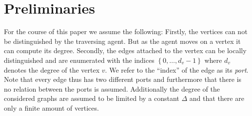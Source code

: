 \documentclass[draft,oneside]{scrartcl}
\begin{document}
\section{Preliminaries}
For the course of this paper we assume the following: Firstly, the vertices can
not be distinguished by the traversing agent. But as the agent moves on a
vertex it can compute its degree. Secondly, the edges attached to the vertex
can be locally distinguished and are enumerated with the indices
$\left\{0,\dots,d_{v}-1\right\}$ where $d_{v}$ denotes the degree of the vertex
$v$. We refer to the \enquote{index} of the edge as its \emph{port}. Note that
every edge thus has two different ports and furthermore that there is no
relation between the ports is assumed. Additionally the degree of the
considered graphs are assumed to be limited by a constant $\Delta$ and that
there are only a finite amount of vertices.
\end{document}
